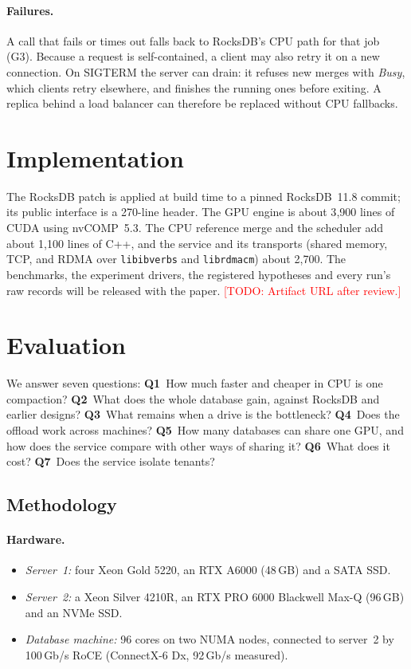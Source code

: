\documentclass[sigconf, nonacm]{acmart}
\newcommand{\todo}[1]{\textcolor{red}{[TODO: #1]}}
\begin{document}
\paragraph{Failures.} A call that fails or times out falls back to RocksDB's CPU path for that
job (G3). Because a request is self-contained, a client may also retry it on a new connection.
On SIGTERM the server can drain: it refuses new merges with \emph{Busy}, which clients retry
elsewhere, and finishes the running ones before exiting. A replica behind a load balancer can
therefore be replaced without CPU fallbacks.

\section{Implementation}
\label{sec:impl}
The RocksDB patch is applied at build time to a pinned RocksDB~11.8 commit; its public
interface is a 270-line header. The GPU engine is about 3{,}900 lines of CUDA using nvCOMP~5.3.
The CPU reference merge and the scheduler add about 1{,}100 lines of C++, and the service and
its transports (shared memory, TCP, and RDMA over \texttt{libibverbs} and
\texttt{librdmacm}) about 2{,}700. The benchmarks, the experiment drivers, the registered
hypotheses and every run's raw records will be released with the paper.
\todo{Artifact URL after review.}

\section{Evaluation}
\label{sec:eval}

We answer seven questions:
\textbf{Q1}~How much faster and cheaper in CPU is one compaction?
\textbf{Q2}~What does the whole database gain, against RocksDB and earlier designs?
\textbf{Q3}~What remains when a drive is the bottleneck?
\textbf{Q4}~Does the offload work across machines?
\textbf{Q5}~How many databases can share one GPU, and how does the service compare with
other ways of sharing it?
\textbf{Q6}~What does it cost?
\textbf{Q7}~Does the service isolate tenants?

\subsection{Methodology}
\label{sec:method}
\paragraph{Hardware.}
\begin{itemize}
  \item \emph{Server~1:} four Xeon Gold 5220, an RTX A6000 (48\,GB) and a SATA SSD.
  \item \emph{Server~2:} a Xeon Silver 4210R, an RTX PRO 6000 Blackwell Max-Q (96\,GB) and an
        NVMe SSD.
  \item \emph{Database machine:} 96 cores on two NUMA nodes, connected to server~2 by
        100\,Gb/s RoCE (ConnectX-6 Dx, 92\,Gb/s measured).
\end{itemize}
\end{document}
